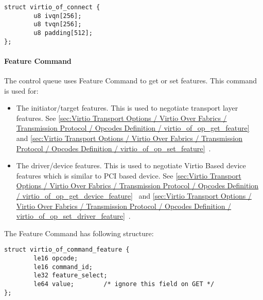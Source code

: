 \begin{lstlisting}
struct virtio_of_connect {
        u8 ivqn[256];
        u8 tvqn[256];
        u8 padding[512];
};
\end{lstlisting}

\paragraph{Feature Command}\label{sec:Virtio Transport Options / Virtio Over Fabrics / Transmission Protocol / Commands Definition / Feature Command}

The control queue uses Feature Command to get or set features. This command is used for:

\begin{itemize}
\item The initiator/target features. This is used to negotiate transport layer features.
See \ref{sec:Virtio Transport Options / Virtio Over Fabrics / Transmission Protocol / Opcodes Definition / virtio_of_op_get_feature}~
and \ref{sec:Virtio Transport Options / Virtio Over Fabrics / Transmission Protocol / Opcodes Definition / virtio_of_op_set_feature}~.
\item The driver/device features. This is used to negotiate Virtio Based device
features which is similar to PCI based device.
See \ref{sec:Virtio Transport Options / Virtio Over Fabrics / Transmission Protocol / Opcodes Definition / virtio_of_op_get_device_feature}~
and \ref{sec:Virtio Transport Options / Virtio Over Fabrics / Transmission Protocol / Opcodes Definition / virtio_of_op_set_driver_feature}~.
\end{itemize}

The Feature Command has following structure:

\begin{lstlisting}
struct virtio_of_command_feature {
        le16 opcode;
        le16 command_id;
        le32 feature_select;
        le64 value;        /* ignore this field on GET */
};
\end{lstlisting}

